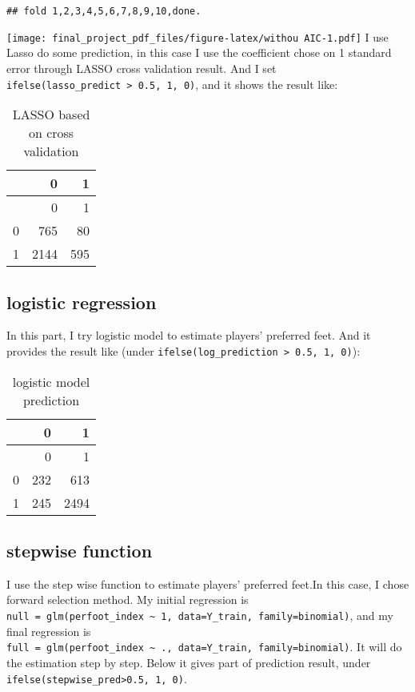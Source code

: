 \documentclass[
]{article}
\begin{document}
\begin{verbatim}
## fold 1,2,3,4,5,6,7,8,9,10,done.
\end{verbatim}

\texttt{[image: final\_project\_pdf\_files/figure-latex/withou AIC-1.pdf]}
I use Lasso do some prediction, in this case I use the coefficient chose
on 1 standard error through LASSO cross validation result. And I set
\texttt{ifelse(lasso\_predict\ \textgreater{}\ 0.5,\ 1,\ 0)}, and it
shows the result like:

\begin{longtable}[]{@{}lrr@{}}
\caption{LASSO based on cross validation}\tabularnewline
\toprule
& 0 & 1 \\
\midrule
\endfirsthead
\toprule
& 0 & 1 \\
\midrule
\endhead
0 & 765 & 80 \\
1 & 2144 & 595 \\
\bottomrule
\end{longtable}

\hypertarget{logistic-regression}{%
\subsection{logistic regression}\label{logistic-regression}}

In this part, I try logistic model to estimate players' preferred feet.
And it provides the result like (under
\texttt{ifelse(log\_prediction\ \textgreater{}\ 0.5,\ 1,\ 0)}):

\begin{longtable}[]{@{}lrr@{}}
\caption{logistic model prediction}\tabularnewline
\toprule
& 0 & 1 \\
\midrule
\endfirsthead
\toprule
& 0 & 1 \\
\midrule
\endhead
0 & 232 & 613 \\
1 & 245 & 2494 \\
\bottomrule
\end{longtable}

\hypertarget{stepwise-function}{%
\subsection{stepwise function}\label{stepwise-function}}

I use the step wise function to estimate players' preferred feet.In this
case, I chose forward selection method. My initial regression is
\texttt{null\ =\ glm(perfoot\_index\ \textasciitilde{}\ 1,\ data=Y\_train,\ family=binomial)},
and my final regression is
\texttt{full\ =\ glm(perfoot\_index\ \textasciitilde{}\ .,\ data=Y\_train,\ family=binomial)}.
It will do the estimation step by step. Below it gives part of
prediction result, under
\texttt{ifelse(stepwise\_pred\textgreater{}0.5,\ 1,\ 0)}.
\end{document}
